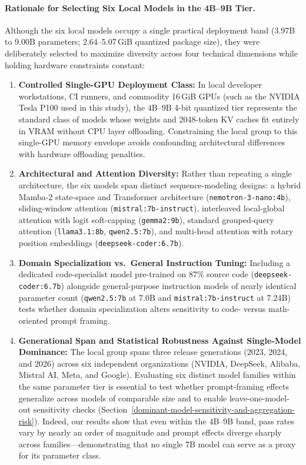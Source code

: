 \documentclass[a4paper,fleqn]{cas-sc}
\providecommand{\tightlist}{%
  \setlength{\itemsep}{0pt}\setlength{\parskip}{0pt}}
\begin{document}
\paragraph{Rationale for Selecting Six Local Models in the 4B--9B Tier.}
Although the six local models occupy a single practical deployment band (3.97B to 9.00B parameters; 2.64--5.07\,GiB quantized package size), they were deliberately selected to maximize diversity across four technical dimensions while holding hardware constraints constant:
\begin{enumerate}
\tightlist
\item \textbf{Controlled Single-GPU Deployment Class:} In local developer workstations, CI runners, and commodity 16\,GiB GPUs (such as the NVIDIA Tesla P100 used in this study), the 4B--9B 4-bit quantized tier represents the standard class of models whose weights and 2048-token KV caches fit entirely in VRAM without CPU layer offloading. Constraining the local group to this single-GPU memory envelope avoids confounding architectural differences with hardware offloading penalties.
\item \textbf{Architectural and Attention Diversity:} Rather than repeating a single architecture, the six models span distinct sequence-modeling designs: a hybrid Mamba-2 state-space and Transformer architecture (\texttt{nemotron-3-nano:4b}), sliding-window attention (\texttt{mistral:7b-instruct}), interleaved local-global attention with logit soft-capping (\texttt{gemma2:9b}), standard grouped-query attention (\texttt{llama3.1:8b}, \texttt{qwen2.5:7b}), and multi-head attention with rotary position embeddings (\texttt{deepseek-coder:6.7b}).
\item \textbf{Domain Specialization vs.\ General Instruction Tuning:} Including a dedicated code-specialist model pre-trained on 87\% source code (\texttt{deepseek-coder:6.7b}) alongside general-purpose instruction models of nearly identical parameter count (\texttt{qwen2.5:7b} at 7.0B and \texttt{mistral:7b-instruct} at 7.24B) tests whether domain specialization alters sensitivity to code- versus math-oriented prompt framing.
\item \textbf{Generational Span and Statistical Robustness Against Single-Model Dominance:} The local group spans three release generations (2023, 2024, and 2026) across six independent organizations (NVIDIA, DeepSeek, Alibaba, Mistral AI, Meta, and Google). Evaluating six distinct model families within the same parameter tier is essential to test whether prompt-framing effects generalize across models of comparable size and to enable leave-one-model-out sensitivity checks (Section~\ref{dominant-model-sensitivity-and-aggregation-risk}). Indeed, our results show that even within the 4B--9B band, pass rates vary by nearly an order of magnitude and prompt effects diverge sharply across families—demonstrating that no single 7B model can serve as a proxy for its parameter class.
\end{enumerate}
\end{document}
